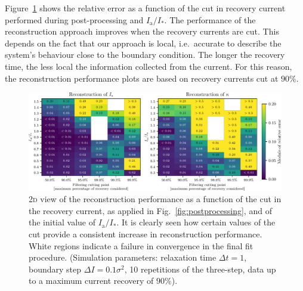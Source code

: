 {Figure~\ref{fig:different_cut} shows the relative error as a function of the cut in recovery current performed during post-processing and $I_\mathrm{a}/I_\ast$. The performance of the reconstruction approach improves when the recovery currents are cut. This depends on the fact that our approach is local, i.e.\ accurate to describe the system's behaviour close to the boundary condition. The longer the recovery time, the less local the information collected from the current. For this reason, the reconstruction performance plots are based on recovery currents cut at $90\%$. 

\begin{figure}[t]
    \centering
    \includegraphics[width=\textwidth]{4_probing_the_diffusive_behavior/figs/final/MULTI_different_filter.pdf}
    \caption{2\textsc{d} view of the reconstruction performance as a function of the cut in the recovery current, as applied in Fig.~\ref{fig:postprocessing}, and of the initial value of $I_\mathrm{a}/I_\ast$. It is clearly seen how certain values of the cut provide a consistent increase in reconstruction performance. White regions indicate a failure in convergence in the final fit procedure. (Simulation parameters: relaxation time $\Delta t=1$, boundary step $\Delta I=0.1 \sigma^2$, 10 repetitions of the three-step, data up to a maximum current recovery of $90\%$).}
    \label{fig:different_cut}
\end{figure}

}
